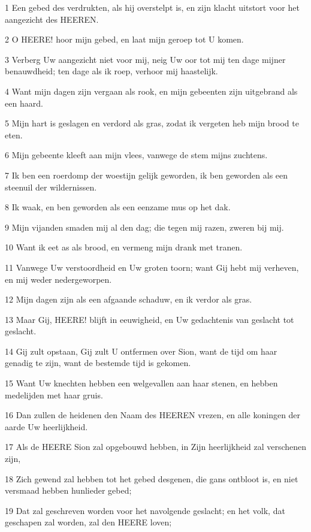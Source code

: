\par 1 Een gebed des verdrukten, als hij overstelpt is, en zijn klacht uitstort voor het aangezicht des HEEREN.
\par 2 O HEERE! hoor mijn gebed, en laat mijn geroep tot U komen.
\par 3 Verberg Uw aangezicht niet voor mij, neig Uw oor tot mij ten dage mijner benauwdheid; ten dage als ik roep, verhoor mij haastelijk.
\par 4 Want mijn dagen zijn vergaan als rook, en mijn gebeenten zijn uitgebrand als een haard.
\par 5 Mijn hart is geslagen en verdord als gras, zodat ik vergeten heb mijn brood te eten.
\par 6 Mijn gebeente kleeft aan mijn vlees, vanwege de stem mijns zuchtens.
\par 7 Ik ben een roerdomp der woestijn gelijk geworden, ik ben geworden als een steenuil der wildernissen.
\par 8 Ik waak, en ben geworden als een eenzame mus op het dak.
\par 9 Mijn vijanden smaden mij al den dag; die tegen mij razen, zweren bij mij.
\par 10 Want ik eet as als brood, en vermeng mijn drank met tranen.
\par 11 Vanwege Uw verstoordheid en Uw groten toorn; want Gij hebt mij verheven, en mij weder nedergeworpen.
\par 12 Mijn dagen zijn als een afgaande schaduw, en ik verdor als gras.
\par 13 Maar Gij, HEERE! blijft in eeuwigheid, en Uw gedachtenis van geslacht tot geslacht.
\par 14 Gij zult opstaan, Gij zult U ontfermen over Sion, want de tijd om haar genadig te zijn, want de bestemde tijd is gekomen.
\par 15 Want Uw knechten hebben een welgevallen aan haar stenen, en hebben medelijden met haar gruis.
\par 16 Dan zullen de heidenen den Naam des HEEREN vrezen, en alle koningen der aarde Uw heerlijkheid.
\par 17 Als de HEERE Sion zal opgebouwd hebben, in Zijn heerlijkheid zal verschenen zijn,
\par 18 Zich gewend zal hebben tot het gebed desgenen, die gans ontbloot is, en niet versmaad hebben hunlieder gebed;
\par 19 Dat zal geschreven worden voor het navolgende geslacht; en het volk, dat geschapen zal worden, zal den HEERE loven;
